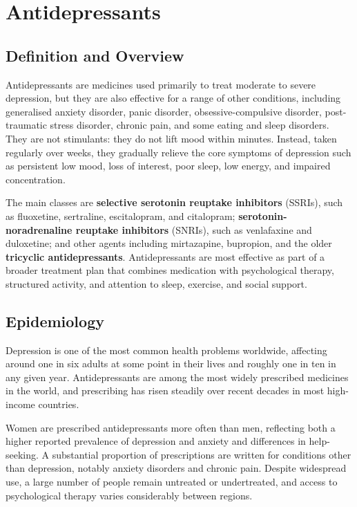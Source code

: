\chapter{Antidepressants}

\section*{Definition and Overview}
Antidepressants are medicines used primarily to treat moderate to severe depression, but they are also effective for a range of other conditions, including generalised anxiety disorder, panic disorder, obsessive-compulsive disorder, post-traumatic stress disorder, chronic pain, and some eating and sleep disorders. They are not stimulants: they do not lift mood within minutes. Instead, taken regularly over weeks, they gradually relieve the core symptoms of depression such as persistent low mood, loss of interest, poor sleep, low energy, and impaired concentration.

The main classes are \textbf{selective serotonin reuptake inhibitors} (SSRIs), such as fluoxetine, sertraline, escitalopram, and citalopram; \textbf{serotonin-noradrenaline reuptake inhibitors} (SNRIs), such as venlafaxine and duloxetine; and other agents including mirtazapine, bupropion, and the older \textbf{tricyclic antidepressants}. Antidepressants are most effective as part of a broader treatment plan that combines medication with psychological therapy, structured activity, and attention to sleep, exercise, and social support.

\section*{Epidemiology}
Depression is one of the most common health problems worldwide, affecting around one in six adults at some point in their lives and roughly one in ten in any given year. Antidepressants are among the most widely prescribed medicines in the world, and prescribing has risen steadily over recent decades in most high-income countries.

Women are prescribed antidepressants more often than men, reflecting both a higher reported prevalence of depression and anxiety and differences in help-seeking. A substantial proportion of prescriptions are written for conditions other than depression, notably anxiety disorders and chronic pain. Despite widespread use, a large number of people remain untreated or undertreated, and access to psychological therapy varies considerably between regions.

